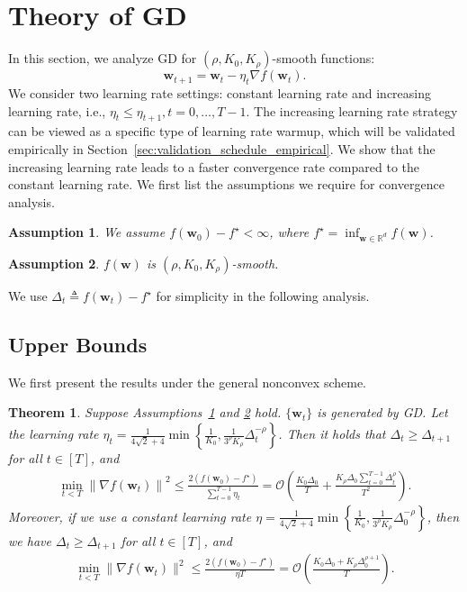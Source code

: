 \documentclass{article}
\newtheorem{theorem}{Theorem}
\newtheorem{assumption}{Assumption}
\newcommand{\Norm}[1]{\left\|#1\right\|}
\newcommand{\Kr}{K_{\rho}}
\newcommand{\bw}{\mathbf{w}}
\begin{document}
\section{Theory of GD}\label{sec:GD}
In this section, we analyze GD for $(\rho,K_0,\Kr)$-smooth functions:
$$\bw_{t+1}=\bw_t-\eta_t\nabla f(\bw_t).$$
We consider two learning rate settings: constant learning rate and increasing learning rate, i.e., $\eta_t\leq\eta_{t+1},t=0,\dots,T-1$. The increasing learning rate strategy can be viewed as a specific type of learning rate warmup, which will be validated empirically in Section~\ref{sec:validation_schedule_empirical}.
We show that the increasing learning rate leads to a faster convergence rate compared to the constant learning rate.
We first list the assumptions we require for convergence analysis.

\begin{assumption}\label{assumption:lower_bounded}
    We assume $f(\bw_0)-f^\star<\infty$, where $f^\star=\inf_{\bw\in\mathbb{R}^d} f(\bw)$.
\end{assumption}

\begin{assumption}\label{assumption:K_smooth}
    $f(\bw)$ is $(\rho,K_0,\Kr)$-smooth.
\end{assumption}


We use $\Delta_t \triangleq f(\bw_t)-f^\star$ for simplicity in the following analysis.


\subsection{Upper Bounds}\label{sec:GD_upper}


We first present the results under the general nonconvex scheme.

\begin{theorem}\label{thm:GD}
    Suppose Assumptions~\ref{assumption:lower_bounded} and \ref{assumption:K_smooth} hold. $\{\bw_t\}$ is generated by GD.
    Let the learning rate 
    $\eta_t= \frac{1}{4\sqrt{2}+4}\min\left\{\frac{1}{K_0}, \frac{1}{3^\rho \Kr}\Delta_t^{-\rho}\right\}$.
    Then it holds that $\Delta_t\geq\Delta_{t+1}$ for all $t\in [T]$, and 
    \begin{align}\label{eq:thm_GD_warmup}
    \min_{t< T}\Norm{\nabla f(\bw_t)}^2\leq \frac{2\left(f(\bw_0)-f^\star\right)}{\sum_{t=0}^{T-1}\eta_t}=\mathcal{O}\left(\frac{K_0\Delta_0}{T}+\frac{\Kr\Delta_0\sum_{t=0}^{T-1}\Delta_t^\rho}{T^2}\right).
    \end{align}
    Moreover, if we use a constant learning rate $\eta= \frac{1}{4\sqrt{2}+4}\min\left\{\frac{1}{K_0}, \frac{1}{3^\rho\Kr}\Delta_0^{-\rho}\right\}$, then we have 
    $\Delta_t\geq\Delta_{t+1}$ for all $t\in[T]$, and 
    \begin{align}\label{eq:thm_GD_constant}
    \min_{t< T}\|\nabla f(\bw_t)\|^2\leq\frac{2\left(f(\bw_0)-f^\star\right)}{\eta T}=\mathcal{O}\left(\frac{K_0\Delta_0+\Kr\Delta_0^{\rho+1}}{T}\right).
    \end{align}
\end{theorem}
\end{document}
